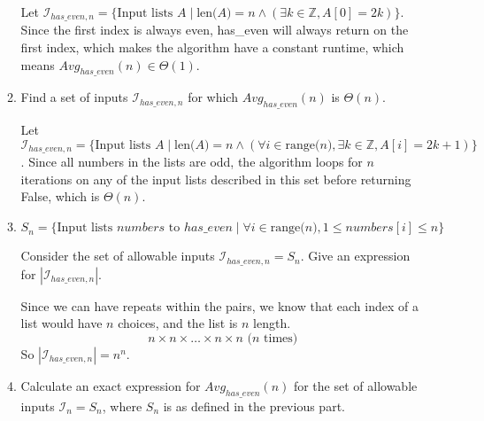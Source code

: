 \documentclass{article}
\begin{document}
\begin{enumerate}
\begin{enumerate}[label=(\alph*)]
                Let $ \mathcal{I}_{has\_even, n} = \{ \text{Input lists 
                $A$} \mid \text{len($A$)} = n \land (\exists k \in \mathbb{Z}, 
                A [0] = 2k )\}$. Since the first index is always even, 
                has\_even will always return on the first index, which makes 
                the algorithm have a constant runtime, which means 
                $Avg_ {has\_even} (n) \in \Theta (1)$. 
            \item Find a set of inputs $\mathcal{I}_{has\_even, n}$ for 
                which $Avg_{has\_even} (n)$ is $\Theta (n)$.
                
                Let $ \mathcal{I}_ {has\_even, n} = \{ \text{Input lists 
                $A$} \mid \text{len($A$)} = n \land (\forall i \in 
                \text{range($n$)}, \exists k \in \mathbb{Z}, 
            A[i] = 2k + 1)  \}$. Since all numbers in the lists are 
            odd, the algorithm loops for $n$ iterations on any of the 
            input lists described in this set before returning 
            False, which is $\Theta (n)$.
        \item $S_n = \{ \text{Input lists } numbers \text{ to } has\_even 
            \mid \forall i \in \text{range($n$)}, 1 \leq numbers[i] \leq n\}$

            Consider the set of allowable inputs $\mathcal{I}_{has\_even, n} = 
            S_n$. Give an expression for $| \mathcal{I}_{has\_even, n}|$. 
                
            Since we can have repeats within the pairs, we know that 
            each index of a list would have $n$ choices, and the 
            list is $n$ length. 
            $$n \times n \times \ldots \times n \times n \text{ ($n$ times)}$$
            So $| \mathcal{I}_{has\_even, n} | = n^n $. 
        \item Calculate an exact expression for $Avg_{has\_even} (n)$ for 
            the set of allowable inputs $\mathcal{I}_n = S_n$, 
            where $S_n$ is as defined in the previous part. 
    

\end{enumerate}
\end{enumerate}
\end{document}
